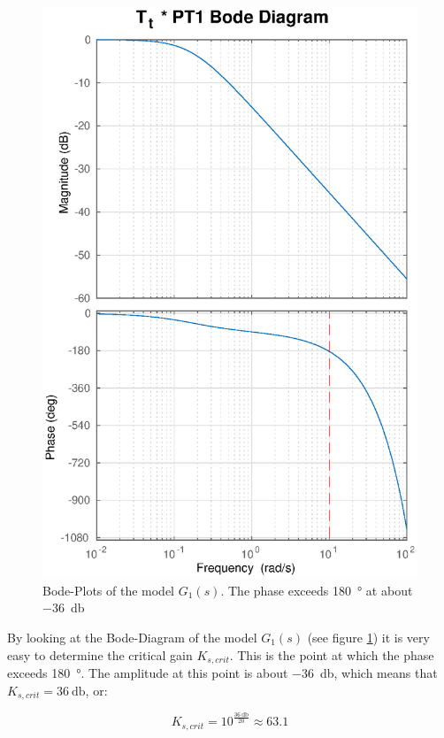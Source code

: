 \begin{figure}
    \centering
    \includegraphics[width=\linewidth]{images/Tt_PT1_bode}
    \caption{Bode-Plots of the model $G_1(s)$. The phase exceeds \SI{180}{\degree} at about \SI{-36}{\decibel}}
    \label{fig:Tt_PT1_bode}
\end{figure}

By  looking  at  the  Bode-Diagram  of  the   model   $G_1(s)$   (see   figure
\ref{fig:Tt_PT1_bode})  it  is  very  easy  to  determine  the  critical  gain
$K_{s,crit}$. This is the  point at which the phase exceeds \SI{180}{\degree}.
The amplitude at  this  point  is  about  \SI{-36}{\decibel}, which means that
$K_{s,crit}=\SI{36}{\decibel}$, or:

\begin{equation}
    K_{s,crit} = 10^{\frac{\SI{36}{\decibel}}{20}} \approx 63.1
\end{equation}

